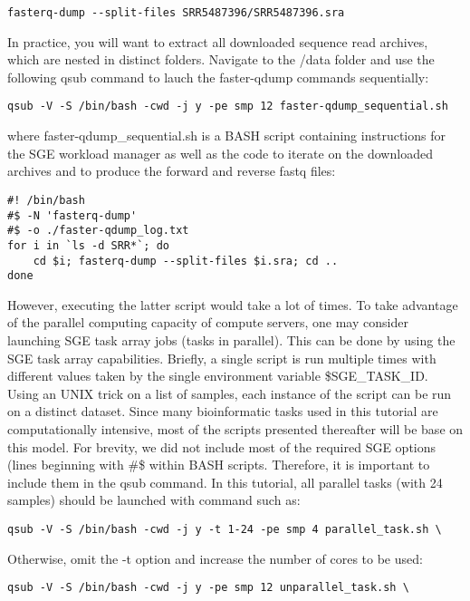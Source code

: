 \begin{verbatim}
fasterq-dump --split-files SRR5487396/SRR5487396.sra
\end{verbatim}

In practice, you will want to extract all downloaded sequence read archives, which are nested in distinct folders. Navigate to the /data folder and use the following qsub command to lauch the faster-qdump commands sequentially:

\begin{verbatim}
qsub -V -S /bin/bash -cwd -j y -pe smp 12 faster-qdump_sequential.sh
\end{verbatim}

where faster-qdump\_sequential.sh is a BASH script containing instructions for the SGE workload manager as well as the code to iterate on the downloaded archives and to produce the forward and reverse fastq files:

\begin{verbatim}
#! /bin/bash
#$ -N 'fasterq-dump'
#$ -o ./faster-qdump_log.txt
for i in `ls -d SRR*`; do
	cd $i; fasterq-dump --split-files $i.sra; cd ..
done
\end{verbatim}


However, executing the latter script would take a lot of times. To take advantage of the parallel computing capacity of compute servers, one may consider launching SGE task array jobs (tasks in parallel). This can be done by using the SGE task array capabilities. Briefly, a single script is run multiple times with different values taken by the single environment variable \$SGE\_TASK\_ID. Using an UNIX trick on a list of samples, each instance of the script can be run on a distinct dataset. Since many bioinformatic tasks used in this tutorial are computationally intensive, most of the scripts presented thereafter will be base on this model. For brevity, we did not include most of the required SGE options (lines beginning with \#\$ within BASH scripts. Therefore, it is important to include them in the qsub command. In this tutorial, all parallel tasks (with 24 samples) should be launched with command such as:
\begin{verbatim}
qsub -V -S /bin/bash -cwd -j y -t 1-24 -pe smp 4 parallel_task.sh \
\end{verbatim}

Otherwise, omit the -t option and increase the number of cores to be used:
\begin{verbatim}
qsub -V -S /bin/bash -cwd -j y -pe smp 12 unparallel_task.sh \
\end{verbatim}

